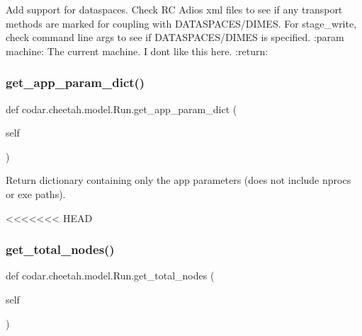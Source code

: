 \begin{DoxyVerb}Add support for dataspaces.
Check RC Adios xml files to see if any transport methods are marked
for coupling with DATASPACES/DIMES.
For stage_write, check command line args to see if DATASPACES/DIMES
is specified.
:param machine: The current machine. I dont like this here.
:return:
\end{DoxyVerb}
 \mbox{\label{classcodar_1_1cheetah_1_1model_1_1_run_a30df1617b81f2cfcde9f57d443ca25cb}} 
\subsubsection{\texorpdfstring{get\+\_\+app\+\_\+param\+\_\+dict()}{get\_app\_param\_dict()}}
{\footnotesize\ttfamily def codar.\+cheetah.\+model.\+Run.\+get\+\_\+app\+\_\+param\+\_\+dict (\begin{DoxyParamCaption}\item[{}]{self }\end{DoxyParamCaption})}

\begin{DoxyVerb}Return dictionary containing only the app parameters
(does not include nprocs or exe paths).\end{DoxyVerb}
<<<<<<< HEAD
 \mbox{\label{classcodar_1_1cheetah_1_1model_1_1_run_ac75c0038a278def4dce9aaf37fbe1c70}} 
\subsubsection{\texorpdfstring{get\+\_\+total\+\_\+nodes()}{get\_total\_nodes()}}
{\footnotesize\ttfamily def codar.\+cheetah.\+model.\+Run.\+get\+\_\+total\+\_\+nodes (\begin{DoxyParamCaption}\item[{}]{self }\end{DoxyParamCaption})}

